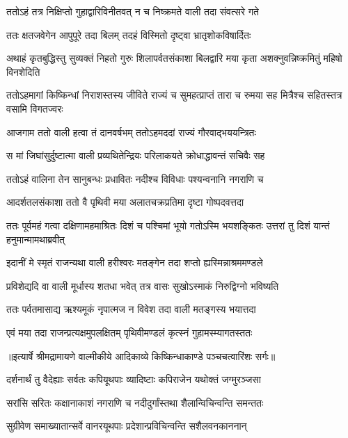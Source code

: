 \twolineshloka
{ततोऽहं तत्र निक्षिप्तो गुहाद्वारिविनीतवत्}
{न च निष्क्रमते वाली तदा संवत्सरे गते} %

\twolineshloka
{ततः क्षतजवेगेन आपुपूरे तदा बिलम्}
{तदहं विस्मितो दृष्ट्वा भ्रातृशोकविषार्दितः} %

\threelineshloka
{अथाहं कृतबुद्धिस्तु सुव्यक्तं निहतो गुरुः}
{शिलापर्वतसंकाशा बिलद्वारि मया कृता}
{अशक्नुवन्निष्क्रमितुं महिषो विनशेदिति} %

\threelineshloka
{ततोऽहमागां किष्किन्धां निराशस्तस्य जीविते}
{राज्यं च सुमहत्प्राप्तं तारा च रुमया सह}
{मित्रैश्च सहितस्तत्र वसामि विगतज्वरः} %

\twolineshloka
{आजगाम ततो वाली हत्वा तं दानवर्षभम्}
{ततोऽहमददां राज्यं गौरवाद्भययन्त्रितः} %

\twolineshloka
{स मां जिघांसुर्दुष्टात्मा वाली प्रव्यथितेन्द्रियः}
{परिलाकयते क्रोधाद्धावन्तं सचिवैः सह} %

\twolineshloka
{ततोऽहं वालिना तेन सानुबन्धः प्रधावितः}
{नदीश्च विविधाः पश्यन्वनानि नगराणि च} %

\twolineshloka
{आदर्शतलसंकाशा ततो वै पृथिवी मया}
{अलातचक्रप्रतिमा दृष्टा गोष्पदवत्तदा} %

\threelineshloka
{ततः पूर्वमहं गत्वा दक्षिणामहमाश्रितः}
{दिशं च पश्चिमां भूयो गतोऽस्मि भयशङ्कितः}
{उत्तरां तु दिशं यान्तं हनुमान्मामथाब्रवीत्} %

\twolineshloka
{इदानीं मे स्मृतं राजन्यथा वाली हरीश्वरः}
{मतङ्गेन तदा शप्तो ह्यस्मिन्नाश्रममण्डले} %

\twolineshloka
{प्रविशेद्यदि वा वाली मूर्धास्य शतधा भवेत्}
{तत्र वासः सुखोऽस्माकं निरुद्विग्नो भविष्यति} %

\twolineshloka
{ततः पर्वतमासाद्य ऋश्यमूकं नृपात्मज}
{न विवेश तदा वाली मतङ्गस्य भयात्तदा} %

\twolineshloka
{एवं मया तदा राजन्प्रत्यक्षमुपलक्षितम्}
{पृथिवीमण्डलं कृत्स्नं गुहामस्म्यागतस्ततः} %


{॥इत्यार्षे श्रीमद्रामायणे वाल्मीकीये आदिकाव्ये किष्किन्धाकाण्डे पञ्चचत्वारिंशः सर्गः॥}


\twolineshloka
{दर्शनार्थं तु वैदेह्याः सर्वतः कपियूथपाः}
{व्यादिष्टाः कपिराजेन यथोक्तं जग्मुरञ्जसा} %

\twolineshloka
{सरांसि सरितः कक्षानाकाशं नगराणि च}
{नदीदुर्गांस्तथा शैलान्विचिन्वन्ति समन्ततः} %

\twolineshloka
{सुग्रीवेण समाख्यातान्सर्वे वानरयूथपाः}
{प्रदेशान्प्रविचिन्वन्ति सशैलवनकाननान्} %

